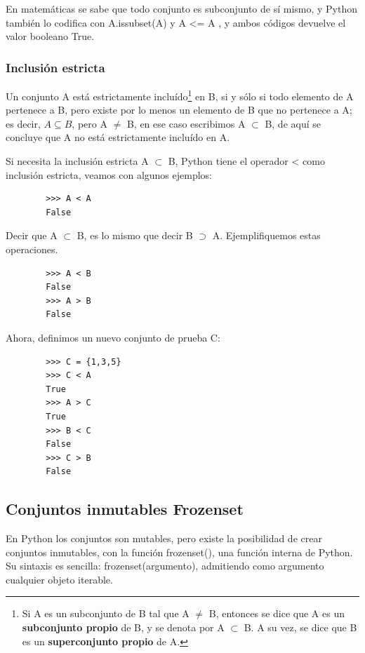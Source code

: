 	En matemáticas se sabe que todo conjunto es subconjunto de sí mismo, y Python también lo codifica con  {\ttfamily A.issubset(A)}  y  {\ttfamily A <= A }, y ambos códigos devuelve el valor booleano True.
	
	\subsubsection{Inclusión estricta}
	
	Un conjunto A está estrictamente incluído\footnote{Si A es un subconjunto de B tal que A $\neq$ B, entonces se dice que A es un {\bf subconjunto propio} de B, y se denota por A $\subset$ B. A su vez, se dice que B es un {\bf superconjunto propio} de A.} en B, si y sólo si todo elemento de A pertenece a B, pero existe por lo menos un elemento de B que no pertenece a A; es decir, $A \subseteq B$, pero A $\neq$ B,  en ese caso escribimos A $\subset$ B, de aquí se concluye que {\ttfamily A} no está estrictamente incluído en {\ttfamily A}.
	
	Si necesita la inclusión estricta {\ttfamily A $\subset $ B}, Python tiene el operador {\ttfamily <{}} como inclusión estricta,  veamos con algunos ejemplos:
	\begin{lstlisting}
		>>> A < A
		False
	\end{lstlisting}
	
	Decir que  A $\subset$ B, es lo mismo que decir B $ \supset$ A.  Ejemplifiquemos estas operaciones.
	\begin{lstlisting}
		>>> A < B
		False
		>>> A > B
		False
	\end{lstlisting}
	
	Ahora, definimos un nuevo conjunto de prueba {\ttfamily C}:
	
	\begin{lstlisting}  
		>>> C = {1,3,5}	
		>>> C < A
		True
		>>> A > C
		True 
		>>> B < C
		False
		>>> C > B
		False
	\end{lstlisting}
	
	
	
	\subsection{Conjuntos inmutables Frozenset}
	
	
	En Python los conjuntos son mutables, pero existe la posibilidad de crear conjuntos inmutables, con la  función {\ttfamily frozenset()}, una función interna  de Python. Su sintaxis es sencilla:  {\ttfamily frozenset(argumento)},  admitiendo como argumento cualquier objeto iterable. 
	
